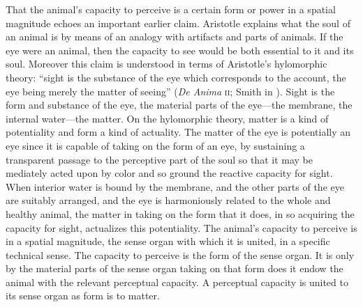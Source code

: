 That the animal's capacity to perceive is a certain form or power in a spatial magnitude echoes an important earlier claim. Aristotle explains what the soul of an animal is by means of an analogy with artifacts and parts of animals. If the eye were an animal, then the capacity to see would be both essential to it and its soul. Moreover this claim is understood in terms of Aristotle's hylomorphic theory: ``sight is the substance of the eye which corresponds to the account, the eye being merely the matter of seeing'' (\emph{De Anima} \textsc{ii}; Smith in \citealt[]{Barnes:1984uq}). Sight is the form and substance of the eye, the material parts of the eye---the membrane, the internal water---the matter. On the hylomorphic theory, matter is a kind of potentiality and form a kind of actuality. The matter of the eye is potentially an eye since it is capable of taking on the form of an eye, by sustaining a transparent passage to the perceptive part of the soul so that it may be mediately acted upon by color and so ground the reactive capacity for sight. When interior water is bound by the membrane, and the other parts of the eye are suitably arranged, and the eye is harmoniously related to the whole and healthy animal, the matter in taking on the form that it does, in so acquiring the capacity for sight, actualizes this potentiality. The animal's capacity to perceive is in a spatial magnitude, the sense organ with which it is united, in a specific technical sense. The capacity to perceive is the form of the sense organ. It is only by the material parts of the sense organ taking on that form does it endow the animal with the relevant perceptual capacity. A perceptual capacity is united to its sense organ as form is to matter.

